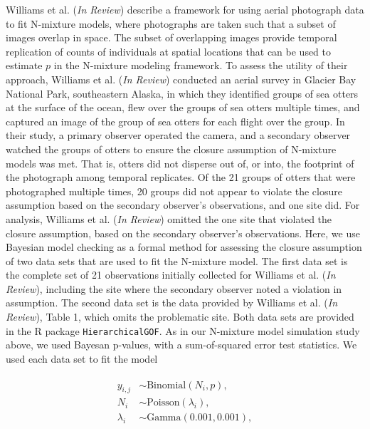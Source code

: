 \documentclass[12pt,english]{article}
\begin{document}
\begin{spacing}{1.9}
    Williams et al. (\emph{In Review}) describe a framework for using
    aerial photograph data to fit N-mixture models, where photographs
    are taken such that a subset of images overlap in space. The
    subset of overlapping images provide temporal replication of
    counts of individuals at spatial locations that can be used to
    estimate $p$ in the N-mixture modeling framework. To assess the
    utility of their approach, Williams et al. (\emph{In Review})
    conducted an aerial survey in Glacier Bay National Park,
    southeastern Alaska, in which they identified groups of sea otters
    at the surface of the ocean, flew over the groups of sea otters
    multiple times, and captured an image of the group of sea otters
    for each flight over the group. In their study, a primary observer
    operated the camera, and a secondary observer watched the groups
    of otters to ensure the closure assumption of N-mixture models was
    met. That is, otters did not disperse out of, or into, the
    footprint of the photograph among temporal replicates. Of the 21
    groups of otters that were photographed multiple times, 20 groups
    did not appear to violate the closure assumption based on the
    secondary observer's observations, and one site did. For analysis,
    Williams et al. (\emph{In Review}) omitted the one site that
    violated the closure assumption, based on the secondary observer's
    observations. Here, we use Bayesian model checking as a formal
    method for assessing the closure assumption of two data sets that
    are used to fit the N-mixture model. The first data set is the
    complete set of 21 observations initially collected for Williams
    et al. (\emph{In Review}), including the site where the secondary
    observer noted a violation in assumption. The second data set is
    the data provided by Williams et al. (\emph{In Review}), Table 1,
    which omits the problematic site. Both data sets are provided in
    the R package \texttt{HierarchicalGOF}. As in our N-mixture model
    simulation study above, we used Bayesan p-values, with a
    sum-of-squared error test statistics. We used each data set to fit
    the model
    \begin{linenomath}
      \begin{align}
        \begin{split}
          y_{i,j} & \sim \text{Binomial}(N_{i},p),\\
          N_{i} & \sim \text{Poisson}(\lambda_{i}), \\
          \lambda_i & \sim
          \text{Gamma}(0.001,0.001), \\

\end{split}
\end{align}
\end{linenomath}
\end{spacing}
\end{document}
